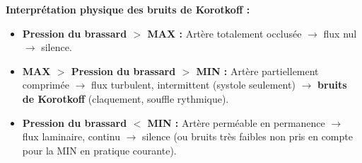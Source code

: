 \documentclass[11pt]{article}
\begin{document}
\begin{experience}
\textbf{Interprétation physique des bruits de Korotkoff :}
\begin{itemize}
    \item \textbf{Pression du brassard $>$ MAX :} Artère totalement occlusée $\rightarrow$ flux nul $\rightarrow$ silence.
    \item \textbf{MAX $>$ Pression du brassard $>$ MIN :} Artère partiellement comprimée $\rightarrow$ flux turbulent, intermittent (systole seulement) $\rightarrow$ \textbf{bruits de Korotkoff} (claquement, souffle rythmique).
    \item \textbf{Pression du brassard $<$ MIN :} Artère perméable en permanence $\rightarrow$ flux laminaire, continu $\rightarrow$ silence (ou bruits très faibles non pris en compte pour la MIN en pratique courante).
\end{itemize}
\end{experience}
\end{document}
